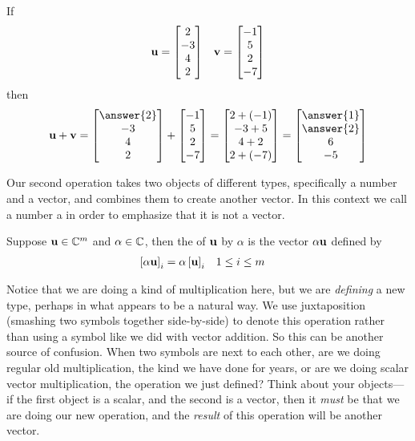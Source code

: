 \documentclass{ximera}
\begin{document}
\begin{example}
  If
  \begin{align*}
    \mathbf{u}=\begin{bmatrix}2\\-3\\4\\2\end{bmatrix}&&\mathbf{v}=\begin{bmatrix}-1\\5\\2\\-7\end{bmatrix}
  \end{align*}
  then
  \[\vect{u}+\vect{v}=
    \colvector{\answer{2}\\-3\\4\\2}+\colvector{-1\\5\\2\\-7}=
    \colvector{2+(-1)\\-3+5\\4+2\\2+(-7)}=
    \colvector{\answer{1}\\\answer{2}\\6\\-5}\]
\end{example}

Our second operation takes two objects of different types,
specifically a number and a vector, and combines them to create
another vector.  In this context we call a number a  in
order to emphasize that it is not a vector.

\begin{definition}
  Suppose $\mathbf{u}\in\mathbb{C}^{m}$ and $\alpha\in\mathbb{C}$, then the
   of $\mathbf{u}$ by $\alpha$ is the vector
  $\alpha\mathbf{u}$ defined by
  \begin{align*}
    \left\lbrack\alpha\mathbf{u}\right\rbrack_{i}
    &=\alpha\left\lbrack\mathbf{u}\right\rbrack_{i}
    &&1\leq i\leq m
  \end{align*}
\end{definition}

Notice that we are doing a kind of multiplication here, but we are
\textit{defining} a new type, perhaps in what appears to be a natural
way.  We use juxtaposition (smashing two symbols together
side-by-side) to denote this operation rather than using a symbol like
we did with vector addition.  So this can be another source of
confusion.  When two symbols are next to each other, are we doing
regular old multiplication, the kind we have done for years, or are we
doing scalar vector multiplication, the operation we just defined?
Think about your objects---if the first object is a scalar, and the
second is a vector, then it \textit{must} be that we are doing our new
operation, and the \textit{result} of this operation will be another
vector.
\end{document}
